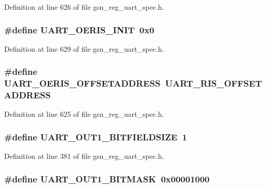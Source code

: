 Definition at line 626 of file gsn\_\-reg\_\-uart\_\-spec.h.

\hypertarget{a00575_afc2bee6699e7d3aa61f559980ea8ec69}{
\subsubsection[{UART\_\-OERIS\_\-INIT}]{\setlength{\rightskip}{0pt plus 5cm}\#define UART\_\-OERIS\_\-INIT~0x0}}
\label{a00575_afc2bee6699e7d3aa61f559980ea8ec69}


Definition at line 629 of file gsn\_\-reg\_\-uart\_\-spec.h.

\hypertarget{a00575_abb228a4d2e303af8138a1f804859afe0}{
\subsubsection[{UART\_\-OERIS\_\-OFFSETADDRESS}]{\setlength{\rightskip}{0pt plus 5cm}\#define UART\_\-OERIS\_\-OFFSETADDRESS~UART\_\-RIS\_\-OFFSETADDRESS}}
\label{a00575_abb228a4d2e303af8138a1f804859afe0}


Definition at line 625 of file gsn\_\-reg\_\-uart\_\-spec.h.

\hypertarget{a00575_ac491dca21636eebf8227497c6a31b248}{
\subsubsection[{UART\_\-OUT1\_\-BITFIELDSIZE}]{\setlength{\rightskip}{0pt plus 5cm}\#define UART\_\-OUT1\_\-BITFIELDSIZE~1}}
\label{a00575_ac491dca21636eebf8227497c6a31b248}


Definition at line 381 of file gsn\_\-reg\_\-uart\_\-spec.h.

\hypertarget{a00575_a4abe19e0c91be7a01feacaabac073542}{
\subsubsection[{UART\_\-OUT1\_\-BITMASK}]{\setlength{\rightskip}{0pt plus 5cm}\#define UART\_\-OUT1\_\-BITMASK~0x00001000}}
\label{a00575_a4abe19e0c91be7a01feacaabac073542}


